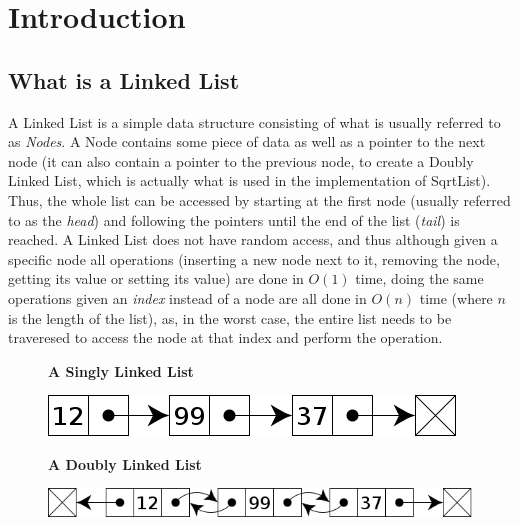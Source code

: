 \documentclass[10pt]{article}
\begin{document}
\vspace{\baselineskip}	%

\section{Introduction}
\subsection{What is a Linked List}
A Linked List is a simple data structure consisting of what is usually referred to as \textit{Nodes}. A Node contains some piece of data as well as a pointer to the next node (it can also contain a pointer to the previous node, to create a Doubly Linked List, which is actually what is used in the implementation of SqrtList). Thus, the whole list can be accessed by starting at the first node (usually referred to as the \textit{head}) and following the pointers until the end of the list (\textit{tail}) is reached. A Linked List does not have random access, and thus although given a specific node all operations (inserting a new node next to it, removing the node, getting its value or setting its value) are done in $O(1)$ time, doing the same operations given an \textit{index} instead of a node are all done in $O(n)$ time (where $n$ is the length of the list), as, in the worst case, the entire list needs to be traveresed to access the node at that index and perform the operation.

\begin{figure}[hbp]
	\centering
	\textbf{A Singly Linked List}\par\medskip
	\includegraphics[width=.5\textwidth]{./img/singly_linked_list.png}
\end{figure}
\begin{figure}[hbp]
	\centering
	\textbf{A Doubly Linked List}\par\medskip
	\includegraphics[width=.5\textwidth]{./img/doubly_linked_list.png}
\end{figure}
\end{document}
